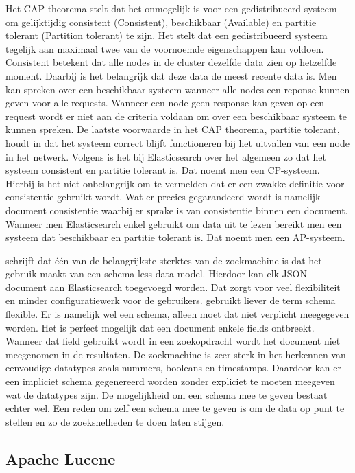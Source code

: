 Het CAP theorema stelt dat het onmogelijk is voor een gedistribueerd systeem om gelijktijdig consistent (Consistent), beschikbaar (Available) en partitie tolerant (Partition tolerant) te zijn. Het stelt dat een gedistribueerd systeem tegelijk aan maximaal twee van de voornoemde eigenschappen kan voldoen. Consistent betekent dat alle nodes in de cluster dezelfde data zien op hetzelfde moment. Daarbij is het belangrijk dat deze data de meest recente data is. Men kan spreken over een beschikbaar systeem wanneer alle nodes een reponse kunnen geven voor alle requests. Wanneer een node geen response kan geven op een request wordt er niet aan de criteria voldaan om over een beschikbaar systeem te kunnen spreken. De laatste voorwaarde in het CAP theorema, partitie tolerant, houdt in dat het systeem correct blijft functioneren bij het uitvallen van een node in het netwerk. Volgens \textcite{Brasetvik2013} is het bij Elasticsearch over het algemeen zo dat het systeem consistent en partitie tolerant is. Dat noemt men een CP-systeem. Hierbij is het niet onbelangrijk om te vermelden dat er een zwakke definitie voor consistentie gebruikt wordt. Wat er precies gegarandeerd wordt is namelijk document consistentie waarbij er sprake is van consistentie binnen een document. Wanneer men Elasticsearch enkel gebruikt om data uit te lezen bereikt men een systeem dat beschikbaar en partitie tolerant is. Dat noemt men een AP-systeem.

\textcite{Glauner2012} schrijft dat één van de belangrijkste sterktes van de zoekmachine is dat het gebruik maakt van een schema-less data model. Hierdoor kan elk JSON document aan Elasticsearch toegevoegd worden. Dat zorgt voor veel flexibiliteit en minder configuratiewerk voor de gebruikers. \textcite{Brasetvik2013} gebruikt liever de term schema flexible. Er is namelijk wel een schema, alleen moet dat niet verplicht meegegeven worden. Het is perfect mogelijk dat een document enkele fields ontbreekt. Wanneer dat field gebruikt wordt in een zoekopdracht wordt het document niet meegenomen in de resultaten. De zoekmachine is zeer sterk in het herkennen van eenvoudige datatypes zoals nummers, booleans en timestamps. Daardoor kan er een impliciet schema gegenereerd worden zonder expliciet te moeten meegeven wat de datatypes zijn. De mogelijkheid om een schema mee te geven bestaat echter wel. Een reden om zelf een schema mee te geven is om de data op punt te stellen en zo de zoeksnelheden te doen laten stijgen.

\subsection{Apache Lucene}

